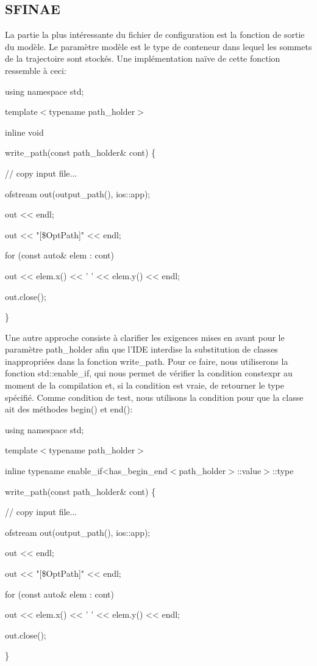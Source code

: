 \documentclass[12pt]{article}
\begin{document}
	\subsection {SFINAE}
	La partie la plus intéressante du fichier de configuration est la fonction de sortie du modèle. Le paramètre modèle est le type de conteneur dans lequel les sommets de la trajectoire sont stockés. Une implémentation naïve de cette fonction ressemble à ceci:
	
	{
		\selectfont
		\setlength{\parindent}{2em}
		using namespace std;
		
		template$<$typename path\_holder$>$
		
		inline void
		
		write\_path(const path\_holder\& cont) \{
		
		\setlength{\parindent}{4em}
		// copy input file...
		
		ofstream out(output\_path(), ios::app);
		
		out << endl;
		
		out << "[\$OptPath]" << endl;
		
		for (const auto\& elem : cont) {
			
			\setlength{\parindent}{6em}	
			out << elem.x() << ' ' << elem.y() << endl;
			
			\setlength{\parindent}{4em}    
		}
		
		out.close();
		
		\setlength{\parindent}{2em}
		\}
	}
	
	Une autre approche consiste à clarifier les exigences mises en avant pour le paramètre path\_holder afin que l'IDE interdise la substitution de classes inappropriées dans la fonction write\_path. Pour ce faire, nous utiliserons la fonction std::enable\_if, qui nous permet de vérifier la condition constexpr au moment de la compilation et, si la condition est vraie, de retourner le type spécifié. Comme condition de test, nous utilisons la condition pour que la classe ait des méthodes begin() et end():
	
	{
		\selectfont
		\setlength{\parindent}{2em}
		using namespace std;
		
		template$<$typename path\_holder$>$
		
		inline typename enable\_if<has\_begin\_end$<$path\_holder$>$::value$>$::type
		
		write\_path(const path\_holder\& cont) \{
		
		\setlength{\parindent}{4em}
		// copy input file...
		
		ofstream out(output\_path(), ios::app);
		
		out << endl;
		
		out << "[\$OptPath]" << endl;
		
		for (const auto\& elem : cont) {
			
			\setlength{\parindent}{6em}	
			out << elem.x() << ' ' << elem.y() << endl;
			
			\setlength{\parindent}{4em}    
		}
		
		out.close();
		
		\setlength{\parindent}{2em}
		\}
	}
	
\end{document}
